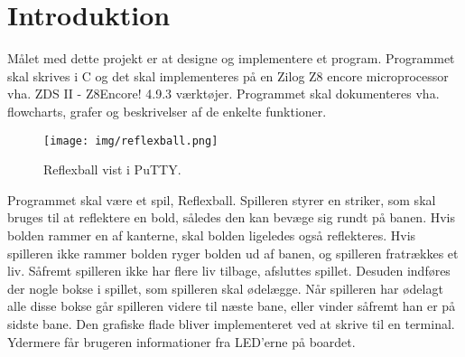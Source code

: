 \section{Introduktion}
Målet med dette projekt er at designe og implementere et program. Programmet skal skrives i C og det skal implementeres på en Zilog Z8 encore microprocessor vha. ZDS II - Z8Encore! 4.9.3 værktøjer. Programmet skal dokumenteres vha. flowcharts, grafer og beskrivelser af de enkelte funktioner.

\begin{figure}[h]
\begin{center}
\texttt{[image: img/reflexball.png]}
\caption{Reflexball vist i PuTTY.}
\end{center}
\end{figure}

Programmet skal være et spil, Reflexball. Spilleren styrer en striker, som skal bruges til at reflektere en bold, således den kan bevæge sig rundt på banen. Hvis bolden rammer en af kanterne, skal bolden ligeledes også reflekteres. Hvis spilleren ikke rammer bolden ryger bolden ud af banen, og spilleren fratrækkes et liv. Såfremt spilleren ikke har flere liv tilbage, afsluttes spillet. Desuden indføres der nogle bokse i spillet, som spilleren skal ødelægge. Når spilleren har ødelagt alle disse bokse går spilleren videre til næste bane, eller vinder såfremt han er på sidste bane. Den grafiske flade bliver implementeret ved at skrive til en terminal. Ydermere får brugeren informationer fra LED'erne på boardet.


 